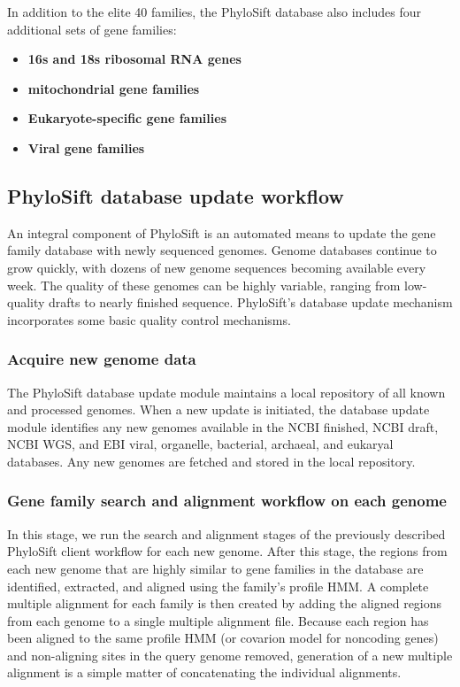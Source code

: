 \documentclass[10pt]{article}
\begin{document}
In addition to the elite 40 families, the PhyloSift database also includes four additional sets of gene families:
\begin{itemize}
\item \textbf{16s and 18s ribosomal {RNA} genes}
\item \textbf{mitochondrial gene families}
\item \textbf{Eukaryote-specific gene families}
\item \textbf{Viral gene families}
\end{itemize}

\subsection*{PhyloSift database update workflow}\label{sec:dbupdate}
An integral component of PhyloSift is an automated means to update the gene family database with newly sequenced genomes.
Genome databases continue to grow quickly, with dozens of new genome sequences becoming available every week.
The quality of these genomes can be highly variable, ranging from low-quality drafts to nearly finished sequence.
PhyloSift's database update mechanism incorporates some basic quality control mechanisms.
\subsubsection*{Acquire new genome data}
The PhyloSift database update module maintains a local repository of all known and processed genomes.
When a new update is initiated, the database update module identifies any new genomes available in the NCBI finished, NCBI draft, NCBI WGS, and EBI viral, organelle, bacterial, archaeal, and eukaryal databases.
Any new genomes are fetched and stored in the local repository.
\subsubsection*{Gene family search and alignment workflow on each genome}
In this stage, we run the search and alignment stages of the previously described PhyloSift client workflow for each new genome.
After this stage, the regions from each new genome that are highly similar to gene families in the database are identified, extracted, and aligned using the family's profile HMM.
A complete multiple alignment for each family is then created by adding the aligned regions from each genome to a single multiple alignment file.
Because each region has been aligned to the same profile HMM (or covarion model for noncoding genes) and non-aligning sites in the query genome removed, generation of a new multiple alignment is a simple matter of concatenating the individual alignments.
\end{document}
